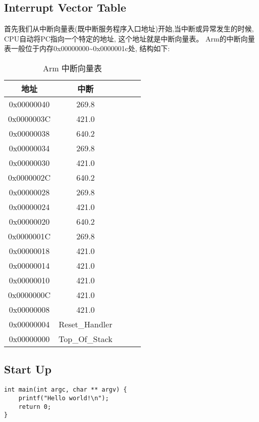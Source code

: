 \subsection{Interrupt Vector Table}
首先我们从中断向量表(既中断服务程序入口地址)开始,当中断或异常发生的时候, CPU自动将PC指向一个特定的地址, 这个地址就是中断向量表。 Arm的中断向量表一般位于内存0x00000000\textasciitilde0x0000001c处, 结构如下:
\begin{table}[htbp]
    \caption{ Arm 中断向量表}\label{tab:table1}
    \vspace{0.5em}\centering\wuhao
    \begin{tabular}{ccccc}
    \toprule[1.5pt]
    地址 & 中断 \\
    \midrule[1pt]

    0x00000040 & 269.8 \\
    0x0000003C & 421.0 \\
    0x00000038 & 640.2 \\
    0x00000034 & 269.8 \\
    0x00000030 & 421.0 \\
    0x0000002C & 640.2 \\
    0x00000028 & 269.8 \\
    0x00000024 & 421.0 \\
    0x00000020 & 640.2 \\
    0x0000001C & 269.8 \\
    0x00000018 & 421.0 \\
    0x00000014 & 421.0 \\
    0x00000010 & 421.0 \\
    0x0000000C & 421.0 \\
    0x00000008 & 421.0 \\
    0x00000004 & Reset\_Handler \\
    0x00000000 & Top\_Of\_Stack \\
    \bottomrule[1.5pt]
    \end{tabular}
    \vspace{\baselineskip}
    \end{table}
    
\subsection{Start Up}


\begin{lstlisting}
int main(int argc, char ** argv) {
    printf("Hello world!\n");
    return 0;
}
\end{lstlisting}

